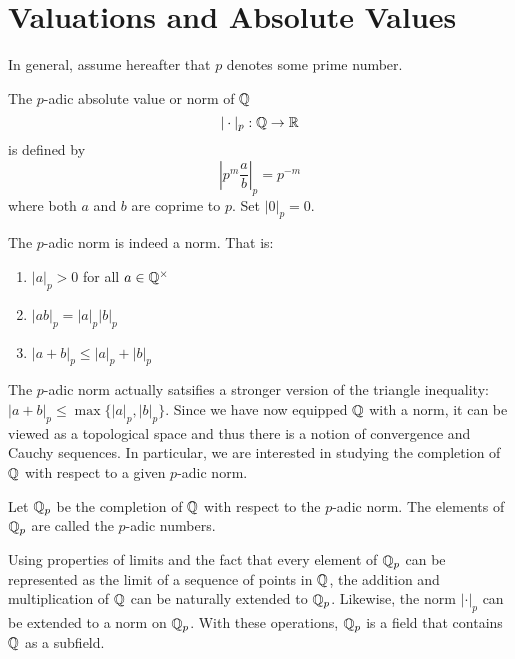 \section{Valuations and Absolute Values}

In general, assume hereafter that $p$ denotes some prime number.

\begin{definition}
    The $p$-adic absolute value or norm of $\mathbb{Q}$
        \[|\cdot |_p: \mathbb{Q} \to \mathbb{R}\]
    is defined by
        \[\left| p^m \frac{a}{b}\right|_{p} = p^{-m}\]
    where both $a$ and $b$ are coprime to $p$. Set $|0|_p = 0$.
\end{definition}

\begin{proposition}
    The $p$-adic norm is indeed a norm. That is:

    \begin{enumerate}
        \item $|a|_p > 0$ for all $a \in \mathbb{Q}^\times$
        \item $|ab|_p = |a|_p|b|_p$
        \item $|a + b|_p \leq |a|_p + |b|_p$
    \end{enumerate}
\end{proposition}

The $p$-adic norm actually satsifies a stronger version of the triangle inequality:
$|a + b|_p \leq \max\{ |a|_p ,|b|_p\}$. Since we have now equipped $\mathbb{Q}$ with a norm, it can be viewed as a topological space and thus there is a notion of convergence and Cauchy sequences. In particular, we are interested in studying the completion of $\mathbb{Q}$ with respect to a given $p$-adic norm.

\begin{definition}
    Let $\mathbb{Q}_p$ be the completion of $\mathbb{Q}$ with respect to the $p$-adic norm. The elements of $\mathbb{Q}_p$ are called the $p$-adic numbers.
\end{definition}

Using properties of limits and the fact that every element of $\mathbb{Q}_p$ can be represented as the limit of a sequence of points in $\mathbb{Q}$, the addition and multiplication of $\mathbb{Q}$ can be naturally extended to $\mathbb{Q}_p$. Likewise, the norm $|\cdot|_p$ can be extended to a norm on $\mathbb{Q}_p$. With these operations, $\mathbb{Q}_p$ is a field that contains $\mathbb{Q}$ as a subfield.